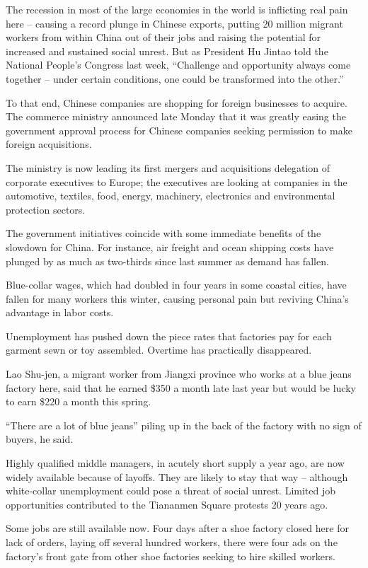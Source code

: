 \documentclass[12pt,a4paper,onecolumn]{article}
\begin{document}
\begin{CJK*}{GBK}{song}
The recession in most of the large economies in the world is inflicting real pain here -- causing a
record plunge in Chinese exports, putting 20 million migrant workers from within China out of their
jobs and raising the potential for increased and sustained social unrest. But as President Hu Jintao
told the National People's Congress last week, ``Challenge and opportunity always come together --
under certain conditions, one could be transformed into the other.''

To that end, Chinese companies are shopping for foreign businesses to acquire. The commerce ministry
announced late Monday that it was greatly easing the government approval process for Chinese
companies seeking permission to make foreign acquisitions.

The ministry is now leading its first mergers and acquisitions delegation of corporate executives to
Europe; the executives are looking at companies in the automotive, textiles, food, energy,
machinery, electronics and environmental protection sectors.

The government initiatives coincide with some immediate benefits of the slowdown for China. For
instance, air freight and ocean shipping costs have plunged by as much as two-thirds since last
summer as demand has fallen.

Blue-collar wages, which had doubled in four years in some coastal cities, have fallen for many
workers this winter, causing personal pain but reviving China's advantage in labor costs.

Unemployment has pushed down the piece rates that factories pay for each garment sewn or toy
assembled. Overtime has practically disappeared.

Lao Shu-jen, a migrant worker from Jiangxi province who works at a blue jeans factory here, said
that he earned \$350 a month late last year but would be lucky to earn \$220 a month this spring.

``There are a lot of blue jeans'' piling up in the back of the factory with no sign of buyers, he
said.

Highly qualified middle managers, in acutely short supply a year ago, are now widely available
because of layoffs. They are likely to stay that way -- although white-collar unemployment could
pose a threat of social unrest. Limited job opportunities contributed to the Tiananmen Square
protests 20 years ago.

Some jobs are still available now. Four days after a shoe factory closed here for lack of orders,
laying off several hundred workers, there were four ads on the factory's front gate from other shoe
factories seeking to hire skilled workers.


\end{CJK*}
\end{document}
